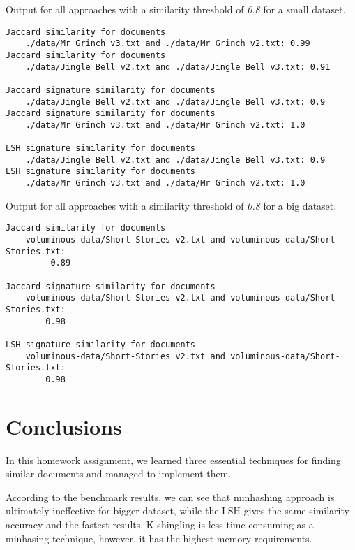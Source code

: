 \documentclass[a4paper, 11pt]{article}
\begin{document}
Output for all approaches with a similarity threshold of \textit{0.8} for a small dataset.
\begin{verbatim}
Jaccard similarity for documents 
    ./data/Mr Grinch v3.txt and ./data/Mr Grinch v2.txt: 0.99
Jaccard similarity for documents 
    ./data/Jingle Bell v2.txt and ./data/Jingle Bell v3.txt: 0.91

Jaccard signature similarity for documents 
    ./data/Jingle Bell v2.txt and ./data/Jingle Bell v3.txt: 0.9
Jaccard signature similarity for documents 
    ./data/Mr Grinch v3.txt and ./data/Mr Grinch v2.txt: 1.0

LSH signature similarity for documents 
    ./data/Jingle Bell v2.txt and ./data/Jingle Bell v3.txt: 0.9
LSH signature similarity for documents 
    ./data/Mr Grinch v3.txt and ./data/Mr Grinch v2.txt: 1.0
\end{verbatim}

Output for all approaches with a similarity threshold of \textit{0.8} for a big dataset.
\begin{verbatim}
Jaccard similarity for documents 
    voluminous-data/Short-Stories v2.txt and voluminous-data/Short-Stories.txt:
         0.89

Jaccard signature similarity for documents 
    voluminous-data/Short-Stories v2.txt and voluminous-data/Short-Stories.txt: 
        0.98

LSH signature similarity for documents 
    voluminous-data/Short-Stories v2.txt and voluminous-data/Short-Stories.txt: 
        0.98
\end{verbatim}

\section{Conclusions}

In this homework assignment, we learned three essential techniques for finding similar documents and managed to implement them.

 According to the benchmark results, we can see that minhashing approach is ultimately ineffective for bigger dataset, while the LSH gives the same similarity accuracy and the fastest results. K-shingling is less time-consuming as a minhasing technique, however, it has the highest memory requirements.
\end{document}
